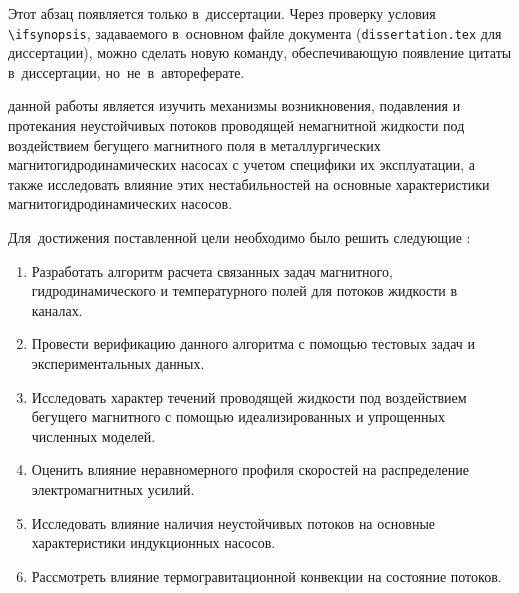 
{\actuality} 
\else
Этот абзац появляется только в~диссертации.
Через проверку условия \verb!\!\verb!ifsynopsis!, задаваемого в~основном файле
документа (\verb!dissertation.tex! для диссертации), можно сделать новую
команду, обеспечивающую появление цитаты в~диссертации, но~не~в~автореферате.
\fi

{\aim} данной работы является изучить механизмы возникновения, подавления и протекания неустойчивых потоков проводящей немагнитной жидкости под воздействием бегущего магнитного поля в металлургических магнитогидродинамических насосах с учетом специфики их эксплуатации, а также исследовать влияние этих нестабильностей на основные характеристики магнитогидродинамических насосов.

Для~достижения поставленной цели необходимо было решить следующие {\tasks}:
\begin{enumerate}[beginpenalty=10000] %
  \item Разработать алгоритм расчета связанных задач магнитного, гидродинамического и температурного полей для потоков жидкости в каналах.
  \item Провести верификацию данного алгоритма с помощью тестовых задач и экспериментальных данных.
  \item Исследовать характер течений проводящей жидкости под воздействием бегущего магнитного с помощью идеализированных и упрощенных численных моделей. 
  \item Оценить влияние неравномерного профиля скоростей на распределение  электромагнитных усилий. 
  \item Исследовать влияние наличия неустойчивых потоков на основные характеристики индукционных насосов.
  \item Рассмотреть влияние термогравитационной конвекции на состояние потоков.  
\end{enumerate}


